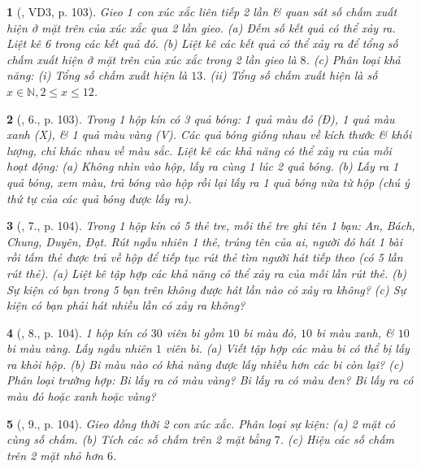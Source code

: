 \documentclass{article}
\newtheorem{baitoan}{}
\begin{document}
\begin{baitoan}[\cite{Tuyen_Toan_6}, VD3, p. 103]
	Gieo 1 con xúc xắc liên tiếp 2 lần \& quan sát số chấm xuất hiện ở mặt trên của xúc xắc qua 2 lần gieo. (a) Đếm số kết quả có thể xảy ra. Liệt kê 6 trong các kết quả đó. (b) Liệt kê các kết quả có thể xảy ra để tổng số chấm xuất hiện ở mặt trên của xúc xắc trong 2 lần gieo là $8$. (c) Phân loại khả năng: (i) Tổng số chấm xuất hiện là $13$. (ii) Tổng số chấm xuất hiện là số $x\in\mathbb{N},2\le x\le12$.
\end{baitoan}

\begin{baitoan}[\cite{Tuyen_Toan_6}, 6., p. 103]
	Trong 1 hộp kín có 3 quả bóng: 1 quả màu đỏ (Đ), 1 quả màu xanh (X), \& 1 quả màu vàng (V). Các quả bóng giống nhau về kích thước \& khối lượng, chỉ khác nhau về màu sắc. Liệt kê các khả năng có thể xảy ra của mỗi hoạt động: (a) Không nhìn vào hộp, lấy ra cùng 1 lúc 2 quả bóng. (b) Lấy ra 1 quả bóng, xem màu, trả bóng vào hộp rồi lại lấy ra 1 quả bóng nữa từ hộp (chú ý thứ tự của các quả bóng được lấy ra).
\end{baitoan}

\begin{baitoan}[\cite{Tuyen_Toan_6}, 7., p. 104]
	Trong 1 hộp kín có 5 thẻ tre, mỗi thẻ tre ghi tên 1 bạn: An, Bách, Chung, Duyên, Đạt. Rút ngẫu nhiên 1 thẻ, trúng tên của ai, người đó hát 1 bài rồi tấm thẻ được trả về hộp để tiếp tục rút thẻ tìm người hát tiếp theo (có 5 lần rút thẻ). (a) Liệt kê tập hợp các khả năng có thể xảy ra của mỗi lần rút thẻ. (b) Sự kiện có bạn trong 5 bạn trên không được hát lần nào có xảy ra không? (c) Sự kiện có bạn phải hát nhiều lần có xảy ra không?
\end{baitoan}

\begin{baitoan}[\cite{Tuyen_Toan_6}, 8., p. 104]
	1 hộp kín có $30$ viên bi gồm $10$ bi màu đỏ, $10$ bi màu xanh, \& $10$ bi màu vàng. Lấy ngẫu nhiên $1$ viên bi. (a) Viết tập hợp các màu bi có thể bị lấy ra khỏi hộp. (b) Bi màu nào có khả năng được lấy nhiều hơn các bi còn lại? (c) Phân loại trường hợp: Bi lấy ra có màu vàng? Bi lấy ra có màu đen? Bi lấy ra có màu đỏ hoặc xanh hoặc vàng?
\end{baitoan}

\begin{baitoan}[\cite{Tuyen_Toan_6}, 9., p. 104]
	Gieo đồng thời 2 con xúc xắc. Phân loại sự kiện: (a) 2 mặt có cùng số chấm. (b) Tích các số chấm trên 2 mặt bằng $7$. (c) Hiệu các số chấm trên 2 mặt nhỏ hơn $6$.
\end{baitoan}
\end{document}
